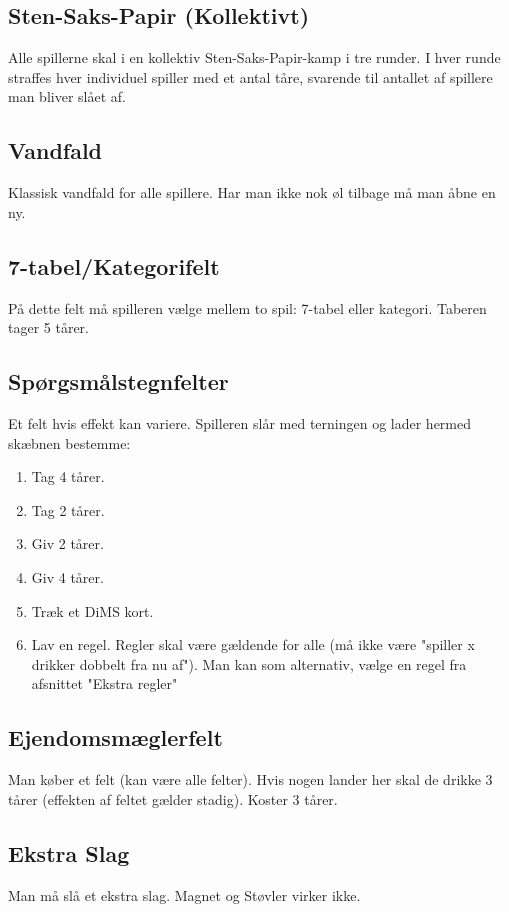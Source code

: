\documentclass{article}
\begin{document}
\subsection{Sten-Saks-Papir (Kollektivt)}
Alle spillerne skal i en kollektiv Sten-Saks-Papir-kamp i tre runder. I hver runde straffes hver individuel spiller med et antal tåre, svarende til antallet af spillere man bliver slået af.
 
\subsection{Vandfald}
Klassisk vandfald for alle spillere. Har man ikke nok øl tilbage må man åbne en ny.
 
\subsection{7-tabel/Kategorifelt}
På dette felt må spilleren vælge mellem to spil: 7-tabel eller kategori. Taberen tager 5 tårer.

\subsection{Spørgsmålstegnfelter}
Et felt hvis effekt kan variere. Spilleren slår med terningen og lader hermed skæbnen bestemme:
\begin{enumerate}
	\item Tag 4 tårer.
	\item Tag 2 tårer.
	\item Giv 2 tårer.
	\item Giv 4 tårer.
	\item Træk et DiMS kort.
	\item Lav en regel. Regler skal være gældende for alle (må ikke være "spiller x drikker dobbelt fra nu af"). Man kan som alternativ, vælge en regel fra afsnittet "Ekstra regler"
\end{enumerate}
 
\subsection{Ejendomsmæglerfelt}
Man køber et felt (kan være alle felter). Hvis nogen lander her skal de drikke 3 tårer (effekten af feltet gælder stadig). Koster 3 tårer.
 
\subsection{Ekstra Slag}
Man må slå et ekstra slag. Magnet og Støvler virker ikke.
\end{document}
